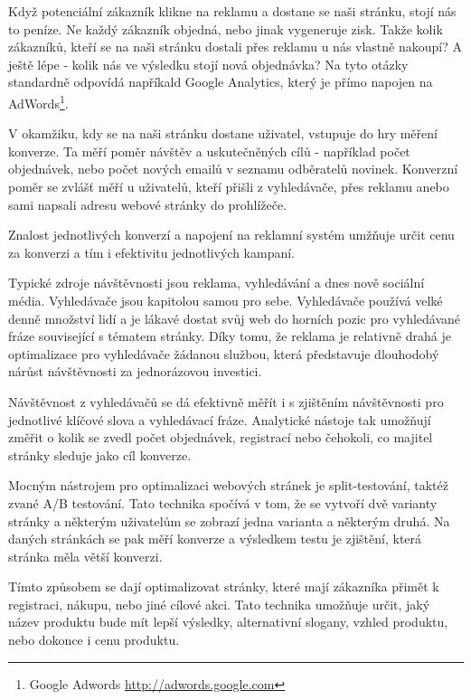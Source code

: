 \documentclass[bc,male,java,dept456]{diploma}						%
\begin{document}
Když potenciální zákazník klikne na reklamu a dostane se naši stránku, stojí nás to peníze. Ne každý zákazník objedná, nebo jinak vygeneruje zisk. Takže kolik zákazníků, kteří se na naši stránku dostali přes reklamu u nás vlastně nakoupí? A ještě lépe - kolik nás ve výsledku stojí nová objednávka? Na tyto otázky standardně odpovídá napříkald Google Analytics, který je přímo napojen na AdWords\footnote{Google Adwords \url{http://adwords.google.com}}.

V okamžiku, kdy se na naši stránku dostane uživatel, vstupuje do hry měření konverze. Ta měří poměr návštěv a uskutečněných cílů - například počet objednávek, nebo počet nových emailů v seznamu odběratelů novinek. Konverzní poměr se zvlášť měří u uživatelů, kteří přišli z vyhledávače, přes reklamu anebo sami napsali adresu webové stránky do prohlížeče.

Znalost jednotlivých konverzí a napojení na reklamní systém umžňuje určit cenu za konverzi a tím i efektivitu jednotlivých kampaní.





Typické zdroje návštěvnosti jsou reklama, vyhledávání a dnes nově sociální média. Vyhledávače jsou kapitolou samou pro sebe. Vyhledávače používá velké denně množství lidí a je lákavé dostat svůj web do horních pozic pro vyhledávané fráze související s tématem stránky. Díky tomu, že reklama je relativně drahá je optimalizace pro vyhledávače žádanou službou, která představuje dlouhodobý nárůst návštěvnosti za jednorázovou investici.

Návštěvnost z vyhledávačů se dá efektivně měřít i s zjištěním návštěvnosti pro jednotlivé klíčové slova a vyhledávací fráze. Analytické nástoje tak umožňují změřit o kolik se zvedl počet objednávek, registrací nebo čehokoli, co majitel stránky sleduje jako cíl konverze.



Mocným nástrojem pro optimalizaci webových stránek je split-testování, taktéž zvané A/B testování. Tato technika spočívá v tom, že se vytvoří dvě varianty stránky a něk\-te\-rým uživatelům se zobrazí jedna varianta a některým druhá. Na daných stránkách se pak měří konverze a výsledkem testu je zjištění, která stránka měla větší konverzi.

Tímto způsobem se dají optimalizovat stránky, které mají zákazníka přimět k registraci, nákupu, nebo jiné cílové akci. Tato technika umožňuje určit, jaký název produktu bude mít lepší výsledky, alternativní slogany, vzhled produktu, nebo dokonce i cenu produktu. 
\end{document}
